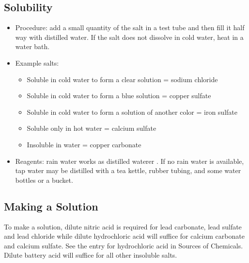 \subsection{Solubility}
\begin{itemize}
\item{Procedure: add a small quantity of the salt in a test tube 
and then fill it half way with distilled water. 
If the salt does not dissolve in cold water, 
heat in a water bath.}
\item{Example salts:}
\begin{itemize}
\item{Soluble in cold water to form a clear solution = sodium chloride}
\item{Soluble in cold water to form a blue solution = copper sulfate}
\item{Soluble in cold water to form a solution of another color = iron sulfate}
\item{Soluble only in hot water = calcium sulfate} 
\item{Insoluble in water = copper carbonate}
\end{itemize}
\item{Reagents: rain water works as distilled waterer . 
If no rain water is available, 
tap water may be distilled with a tea kettle, 
rubber tubing, 
and some water bottles or a bucket.}
\end{itemize}

\subsection{Making a Solution}

To make a solution, 
dilute nitric acid is required for lead carbonate, 
lead sulfate and lead chloride 
while dilute hydrochloric acid will suffice 
for calcium carbonate and calcium sulfate. 
See the entry for hydrochloric acid in Sources of Chemicals. 
Dilute battery acid will suffice for all other insoluble salts. 

